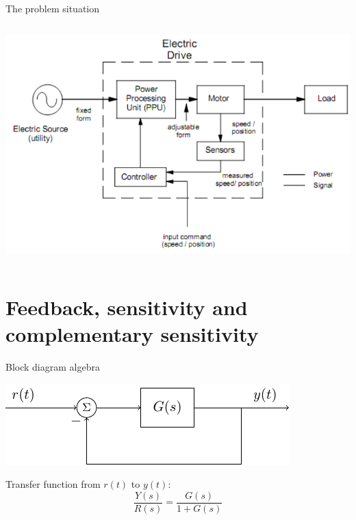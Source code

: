 \documentclass[presentation,aspectratio=169, usenames, dvipsnames]{beamer}
\begin{document}
\begin{frame}[label={sec:org6f52b65}]{The problem situation}
\begin{columns}
\begin{column}{0.6\columnwidth}
\begin{center}
\includegraphics[width=\linewidth]{../../figures/electric-drive-block.png}
\end{center}
\end{column}
\end{columns}
\end{frame}

\section{Feedback, sensitivity and complementary sensitivity}
\label{sec:org01b3bf2}

\begin{frame}[label={sec:org9815f71}]{Block diagram algebra}
\begin{center}
  \includegraphics[width=.6\linewidth]{../../figures/block-simple-feedback}
\end{center}

Transfer function from \(r(t)\) to \(y(t)\):
\[ \frac{Y(s)}{R(s)} = \frac{G(s)}{ 1+ G(s)}\]
\end{frame}
\end{document}
